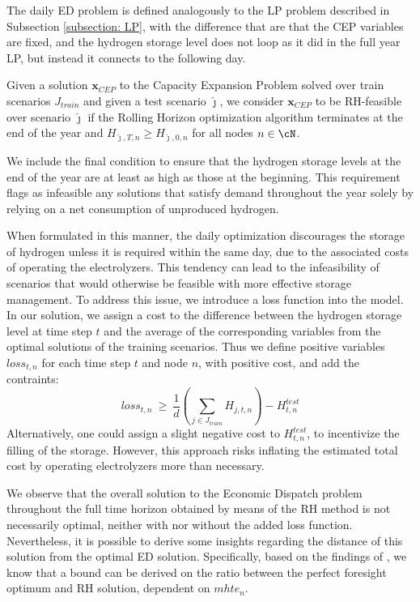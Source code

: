 \documentclass[smallextended,natbib]{svjour3}       %
\numberwithin{definition}{section}
\numberwithin{theorem}{section}
\numberwithin{proposition}{section}
\begin{document}
The daily ED problem is defined analogously to the LP problem described in Subsection \ref{subsection: LP}, with the difference that are that the CEP variables are fixed, and the hydrogen storage level does not loop as it did in the full year LP, but instead it connects to the following day.

\begin{definition}[RH-feasibility]
  Given a solution $\mathbf{x}_{CEP}$ to the Capacity Expansion Problem solved over train scenarios $J_{train}$ and given a test scenario $\hat{\jmath}$, we consider $\mathbf{x}_{CEP}$ to be RH-feasible over scenario $\hat{\jmath}$ if the Rolling Horizon optimization algorithm terminates at the end of the year and $H_{\hat{\jmath},T,n}\ge H_{\hat{\jmath},0,n}$ for all nodes $n\in\cN$.
  \end{definition}
We include the final condition to ensure that the hydrogen storage levels at the end of the year are at least as high as those at the beginning. This requirement flags as infeasible any solutions that satisfy demand throughout the year solely by relying on a net consumption of unproduced hydrogen.

When formulated in this manner, the daily optimization discourages the storage of hydrogen unless it is required within the same day, due to the associated costs of operating the electrolyzers. 
This tendency can lead to the infeasibility of scenarios that would otherwise be feasible with more effective storage management. 
To address this issue, we introduce a loss function into the model. 
In our solution, we assign a cost to the difference between the hydrogen storage level at time step $t$ and the average of the corresponding variables from the optimal solutions of the training scenarios.
Thus we define positive variables $loss_{t,n}$ for each time step $t$ and node $n$, with positive cost, and add the contraints:
\begin{equation}
loss_{t,n}\ \ge\ \frac{1}{d}\left(\sum_{j\in J_{train}}H_{j,t,n}\right) - H^{test}_{t,n} 
\end{equation}
Alternatively, one could assign a slight negative cost to $H^{test}_{t,n}$, to incentivize the filling of the storage. 
However, this approach risks inflating the estimated total cost by operating electrolyzers more than necessary.


We observe that the overall solution to the Economic Dispatch problem throughout the full time horizon obtained by means of the RH method is not necessarily optimal, neither with nor without the added loss function. 
Nevertheless, it is possible to derive some insights regarding the distance of this solution from the optimal ED solution.
Specifically, based on the findings of \citet{INTRO_Glomb}, we know that a bound can be derived on the ratio between the perfect foresight optimum and RH solution, dependent on $mhte_n$.
\end{document}
